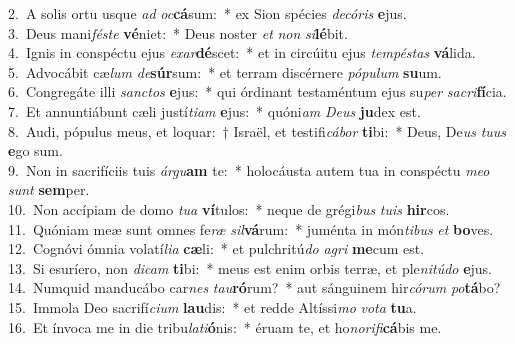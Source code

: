 {2.~}A solis ortu usque \textit{ad} \textit{oc}\textbf{cá}sum:~* ex Sion spécies \textit{de}\textit{có}\textit{ris} \textbf{e}jus.\\
{3.~}Deus mani\textit{fé}\textit{ste} \textbf{vé}niet:~* Deus noster \textit{et} \textit{non} \textit{si}\textbf{lé}bit.\\
{4.~}Ignis in conspéctu ejus \textit{e}\textit{xar}\textbf{dé}scet:~* et in circúitu ejus \textit{tem}\textit{pé}\textit{stas} \textbf{vá}lida.\\
{5.~}Advocábit cæ\textit{lum} \textit{de}\textbf{súr}sum:~* et terram discérnere \textit{pó}\textit{pu}\textit{lum} \textbf{su}um.\\
{6.~}Congregáte illi \textit{san}\textit{ctos} \textbf{e}jus:~* qui órdinant testaméntum ejus su\textit{per} \textit{sa}\textit{cri}\textbf{fí}cia.\\
{7.~}Et annuntiábunt cæli justí\textit{ti}\textit{am} \textbf{e}jus:~* quóni\textit{am} \textit{De}\textit{us} \textbf{ju}dex est.\\
{8.~}Audi, pópulus meus, et loquar:~† Israël, et testifi\textit{cá}\textit{bor} \textbf{ti}bi:~* Deus, De\textit{us} \textit{tu}\textit{us} \textbf{e}go sum.\\
{9.~}Non in sacrifíciis tuis \textit{ár}\textit{gu}\textbf{am} te:~* holocáusta autem tua in conspéctu \textit{me}\textit{o} \textit{sunt} \textbf{sem}per.\\
{10.~}Non accípiam de domo \textit{tu}\textit{a} \textbf{ví}tulos:~* neque de grégi\textit{bus} \textit{tu}\textit{is} \textbf{hir}cos.\\
{11.~}Quóniam meæ sunt omnes fe\textit{ræ} \textit{sil}\textbf{vá}rum:~* juménta in món\textit{ti}\textit{bus} \textit{et} \textbf{bo}ves.\\
{12.~}Cognóvi ómnia volatí\textit{li}\textit{a} \textbf{cæ}li:~* et pulchritú\textit{do} \textit{a}\textit{gri} \textbf{me}cum est.\\
{13.~}Si esuríero, non \textit{di}\textit{cam} \textbf{ti}bi:~* meus est enim orbis terræ, et ple\textit{ni}\textit{tú}\textit{do} \textbf{e}jus.\\
{14.~}Numquid manducábo car\textit{nes} \textit{tau}\textbf{ró}rum?~* aut sánguinem hir\textit{có}\textit{rum} \textit{po}\textbf{tá}bo?\\
{15.~}Immola Deo sacrifí\textit{ci}\textit{um} \textbf{lau}dis:~* et redde Altíssi\textit{mo} \textit{vo}\textit{ta} \textbf{tu}a.\\
{16.~}Et ínvoca me in die tribu\textit{la}\textit{ti}\textbf{ó}nis:~* éruam te, et ho\textit{no}\textit{ri}\textit{fi}\textbf{cá}bis me.\\
